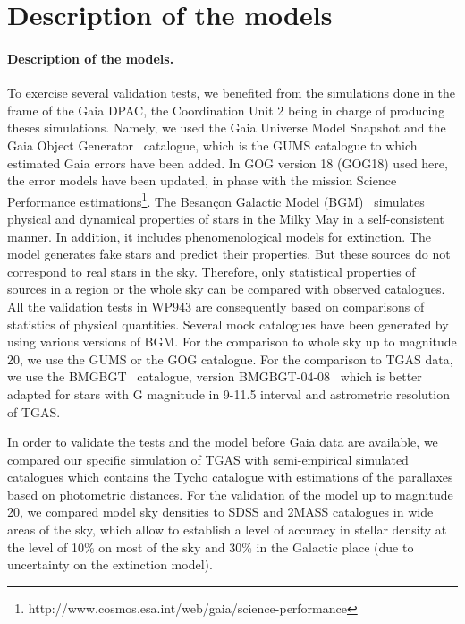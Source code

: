 
\section{Description of the models} \label{app:models}

\paragraph{Description of the models.}\label{ssec:modeldesc}
To exercise several validation tests, we benefited from the simulations
done in the frame of the Gaia DPAC, the Coordination Unit 2 being in
charge of producing theses simulations. Namely, we used the
Gaia Universe Model Snapshot \citep[GUMS, ][]{2012A&A...543A.100R} and 
the Gaia Object Generator~\citep[GOG, ][]{2014A&A...566A.119L} catalogue, which is the GUMS catalogue 
to which estimated Gaia errors have been added. In GOG version 18 (GOG18) used here, the error models have been updated, in phase with the mission Science Performance estimations\footnote{http://www.cosmos.esa.int/web/gaia/science-performance}.
The Besan\c{c}on Galactic Model (BGM)~\citep{bgm} simulates physical and dynamical properties of stars 
in the Milky May in a self-consistent manner. In addition, it includes phenomenological models 
for extinction. The model generates fake stars and predict
their properties. But these sources do not correspond to real stars in the sky. Therefore, only 
statistical properties of sources in a region or the whole sky can be compared with 
observed catalogues. All the validation tests in WP943 are consequently based 
on comparisons of statistics of physical quantities. Several mock catalogues have been generated by using 
various versions of BGM. For the comparison to whole sky up to magnitude 20, we use the GUMS or the GOG catalogue. For the comparison to TGAS data, we use the BMGBGT~\citep{2014A&A...564A.102C} catalogue, version BMGBGT-04-08~\citep{2014A&A...564A.102C} which is better adapted 
for stars with G magnitude in 9-11.5 interval and astrometric resolution of TGAS. 

In order to validate the tests and the model before Gaia data are available, we compared our specific simulation of TGAS with 
semi-empirical simulated catalogues which contains the Tycho catalogue 
with estimations of the parallaxes based on photometric distances. For the validation of the model up to magnitude 20, we compared model sky densities to SDSS and 2MASS catalogues \citep{2012A&A...538A.106R,2014A&A...569A..13R} in wide areas of the sky, which allow to establish a level of accuracy in stellar density at the level of 10\% on most of the sky and 30\% in the Galactic place (due to uncertainty on the extinction model).

